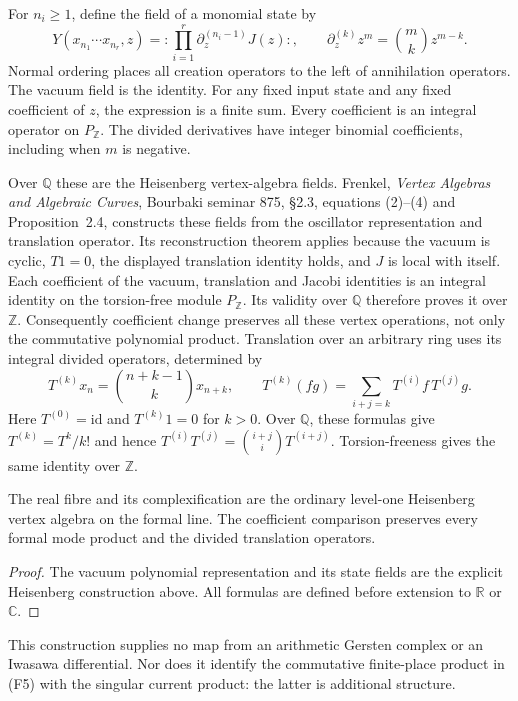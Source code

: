 For $n_i\ge1$, define the field of a monomial state by
\[
 Y(x_{n_1}\cdots x_{n_r},z)
 =:\prod_{i=1}^r\partial_z^{(n_i-1)}J(z):,
 \qquad \partial_z^{(k)}z^m=\binom{m}{k}z^{m-k}.
\]
Normal ordering places all creation operators to the left of annihilation
operators. The vacuum field is the identity. For any fixed input state
and any fixed coefficient of $z$, the expression is a finite sum.
Every coefficient is an integral operator on $P_{\mathbb Z}$.
The divided derivatives have integer binomial coefficients, including
when $m$ is negative.

Over $\mathbb Q$ these are the Heisenberg vertex-algebra fields.
Frenkel, \emph{Vertex Algebras and Algebraic Curves}, Bourbaki seminar
875, \S2.3, equations (2)--(4) and Proposition~2.4, constructs these
fields from the oscillator representation and translation operator.
Its reconstruction theorem applies because the vacuum is cyclic,
$T1=0$, the displayed translation identity holds, and $J$ is local
with itself.
Each coefficient of the vacuum, translation and Jacobi identities is
an integral identity on the torsion-free module $P_{\mathbb Z}$.
Its validity over $\mathbb Q$ therefore proves it over $\mathbb Z$.
Consequently coefficient change preserves all these vertex operations,
not only the commutative polynomial product. Translation over an arbitrary
ring uses its integral divided operators, determined by
\[
 T^{(k)}x_n=\binom{n+k-1}{k}x_{n+k},\qquad
 T^{(k)}(fg)=\sum_{i+j=k}T^{(i)}f\,T^{(j)}g.
\]
Here $T^{(0)}=\mathrm{id}$ and $T^{(k)}1=0$ for $k>0$.
Over $\mathbb Q$, these formulas give $T^{(k)}=T^k/k!$ and hence
$T^{(i)}T^{(j)}=\binom{i+j}{i}T^{(i+j)}$.
Torsion-freeness gives the same identity over $\mathbb Z$.
\begin{corollary}
\label{v4-arith:pos-costello:cor:SFBZ-compat}
The real fibre and its complexification are the ordinary level-one
Heisenberg vertex algebra on the formal line. The coefficient comparison
preserves every formal mode product and the divided translation operators.
\end{corollary}

\begin{proof}
The vacuum polynomial representation and its state fields are the
explicit Heisenberg construction above. All formulas are defined before
extension to $\mathbb R$ or $\mathbb C$.
\end{proof}

This construction supplies
no map from an arithmetic Gersten complex or an Iwasawa differential.
Nor does it identify the commutative finite-place product in (F5) with
the singular current product: the latter is additional structure.

